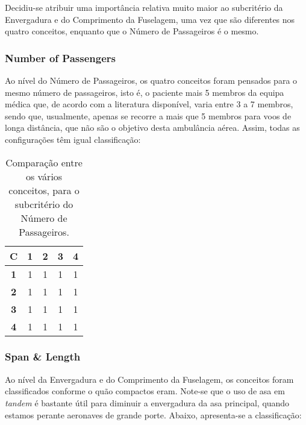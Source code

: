 Decidiu-se atribuir uma importância relativa muito maior ao subcritério da Envergadura e do Comprimento da Fuselagem, uma vez que são diferentes nos quatro conceitos, enquanto que o Número de Passageiros é o mesmo.




\subsubsection{Number of Passengers}

Ao nível do Número de Passageiros, os quatro conceitos foram pensados para o mesmo número de passageiros, isto é, o paciente mais 5 membros da equipa médica que, de acordo com a literatura disponível, varia entre 3 a 7 membros, sendo que, usualmente, apenas se recorre a mais que 5 membros para voos de longa distância, que não são o objetivo desta ambulância aérea. Assim, todas as configurações têm igual classificação:

\begin{table}[H]
\begin{center}
\caption{Comparação entre os vários conceitos, para o subcritério do Número de Passageiros.}
\begin{tabular}{ |c|c c c c| }
 \hline
 \textbf{C} & \textbf{1} & \textbf{2} & \textbf{3} & \textbf{4}  \\
\hline
 \textbf{1} & 1 & 1 & 1 & 1 \\
 \textbf{2} & 1 & 1 & 1 & 1  \\
 \textbf{3} & 1 & 1 & 1 & 1  \\
 \textbf{4} & 1 & 1 & 1 & 1  \\
\hline
\end{tabular}
\end{center}
\end{table}





\subsubsection{Span \& Length}

Ao nível da Envergadura e do Comprimento da Fuselagem, os conceitos foram classificados conforme o quão compactos eram. Note-se que o uso de asa em \textit{tandem} é bastante útil para diminuir a envergadura da asa principal, quando estamos perante aeronaves de grande porte. Abaixo, apresenta-se a classificação:

